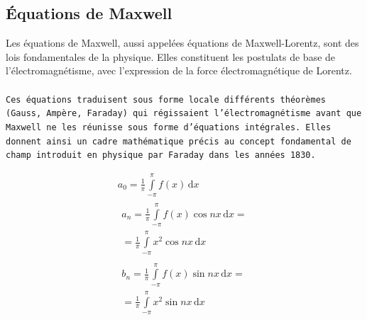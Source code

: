 \documentclass{article}
\begin{document}
\newpage

\subsection{Équations de Maxwell}

Les équations de Maxwell, aussi appelées équations de Maxwell-Lorentz, sont des lois fondamentales de la physique. Elles constituent les postulats de base de l'électromagnétisme, avec l'expression de la force électromagnétique de Lorentz.
\ \\ \ \\
\texttt{Ces équations traduisent sous forme locale différents théorèmes (Gauss, Ampère, Faraday) qui régissaient l'électromagnétisme avant que Maxwell ne les réunisse sous forme d'équations intégrales. Elles donnent ainsi un cadre mathématique précis au concept fondamental de champ introduit en physique par Faraday dans les années 1830.}

\begin{gather*}
a_0=\frac{1}{\pi}\int\limits_{-\pi}^{\pi}f(x)\,\mathrm{d}x\\[6pt]
\begin{split}
a_n=\frac{1}{\pi}\int\limits_{-\pi}^{\pi}f(x)\cos nx\,\mathrm{d}x=\\
=\frac{1}{\pi}\int\limits_{-\pi}^{\pi}x^2\cos nx\,\mathrm{d}x
\end{split}\\[6pt]
\begin{split}
b_n=\frac{1}{\pi}\int\limits_{-\pi}^{\pi}f(x)\sin nx\,\mathrm{d}x=\\
=\frac{1}{\pi}\int\limits_{-\pi}^{\pi}x^2\sin nx\,\mathrm{d}x
\end{split}\\[6pt]
\end{gather*}
\end{document}
